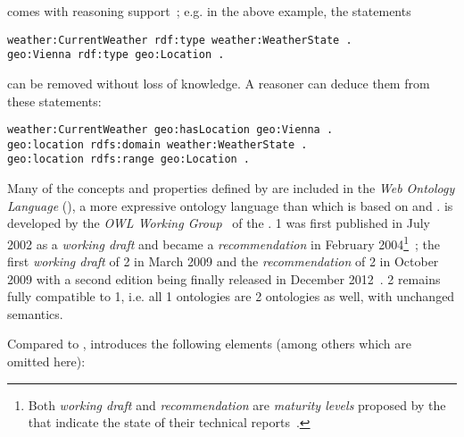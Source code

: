  comes with reasoning support~\cite{RDF_semantics}; e.g. in the above example, the statements

\begin{lstlisting}
weather:CurrentWeather rdf:type weather:WeatherState .
geo:Vienna rdf:type geo:Location .
\end{lstlisting}

can be removed without loss of knowledge. A reasoner can deduce them from these statements:

\begin{lstlisting}
weather:CurrentWeather geo:hasLocation geo:Vienna .
geo:location rdfs:domain weather:WeatherState .
geo:location rdfs:range geo:Location .
\end{lstlisting}

\vspace{1em}

Many of the concepts and properties defined by  are included in the \emph{Web Ontology Language} (), a more expressive ontology language than  which is based on  and .  is developed by the \emph{OWL Working Group}~\cite{OWL-working-group} of the .  1 was first published in July 2002 as a \emph{working draft} and became a  \emph{recommendation} in February 2004\footnote{Both \emph{working draft} and \emph{recommendation} are \emph{maturity levels} proposed by the  that indicate the state of their technical reports~\cite{w3c-process}.}~\cite{OWL1}; the first \emph{working draft} of  2 in March 2009 and the  \emph{recommendation} of  2 in October 2009 with a second edition being finally released in December 2012~\cite{OWL}.
 2 remains fully compatible to  1, i.e. all  1 ontologies are  2 ontologies as well, with unchanged semantics.

Compared to ,  introduces the following elements (among others which are omitted here):

